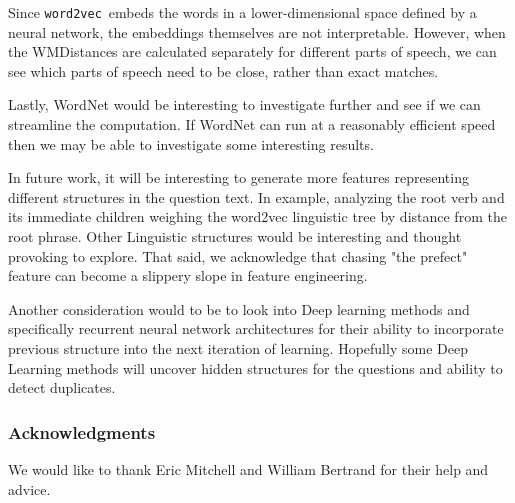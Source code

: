 \documentclass{article} %
\newcommand{\wordtvec}{\texttt{word2vec}}
\begin{document}
Since \wordtvec\ embeds the words in a lower-dimensional space defined by a neural network, the embeddings themselves are not interpretable. However, when the WMDistances are calculated separately for different parts of speech, we can see which parts of speech need to be close, rather than exact matches. 

Lastly, WordNet would be interesting to investigate further and see if we can streamline the computation. If WordNet can run at a reasonably efficient speed then we may be able to investigate some interesting results. 

In future work, it will be interesting to generate more features representing different structures in the question text. In example, analyzing the root verb and its immediate children weighing the word2vec linguistic tree by distance from the root phrase. Other Linguistic structures would be interesting and thought provoking to explore. That said, we acknowledge that chasing "the prefect" feature can become a slippery slope in feature engineering.

Another consideration would to be to look into Deep learning methods and specifically recurrent neural network architectures for their ability to incorporate previous structure into the next iteration of learning. Hopefully some Deep Learning methods will uncover hidden structures for the questions and ability to detect duplicates.

\subsubsection*{Acknowledgments}

We would like to thank Eric Mitchell and William Bertrand for their help and advice.

\printbibliography
\end{document}
